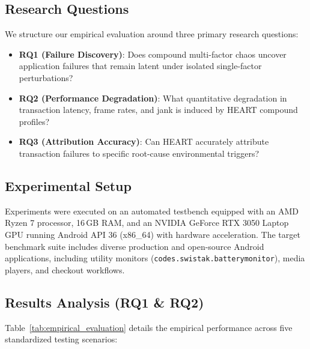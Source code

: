 \documentclass[conference]{IEEEtran}
\begin{document}
\subsection{Research Questions}
We structure our empirical evaluation around three primary research questions:
\begin{itemize}
    \item \textbf{RQ1 (Failure Discovery)}: Does compound multi-factor chaos uncover application failures that remain latent under isolated single-factor perturbations?
    \item \textbf{RQ2 (Performance Degradation)}: What quantitative degradation in transaction latency, frame rates, and jank is induced by HEART compound profiles?
    \item \textbf{RQ3 (Attribution Accuracy)}: Can HEART accurately attribute transaction failures to specific root-cause environmental triggers?
\end{itemize}

\subsection{Experimental Setup}
Experiments were executed on an automated testbench equipped with an AMD Ryzen 7 processor, 16\,GB RAM, and an NVIDIA GeForce RTX 3050 Laptop GPU running Android API 36 (x86\_64) with hardware acceleration. The target benchmark suite includes diverse production and open-source Android applications, including utility monitors (\texttt{codes.swistak.batterymonitor}), media players, and checkout workflows.



\subsection{Results Analysis (RQ1 \& RQ2)}
Table~\ref{tab:empirical_evaluation} details the empirical performance across five standardized testing scenarios:
\end{document}
